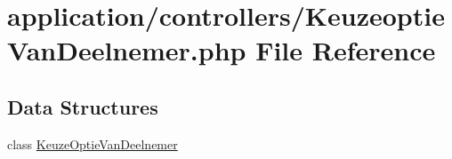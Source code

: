 \hypertarget{_keuzeoptie_van_deelnemer_8php}{}\section{application/controllers/\+Keuzeoptie\+Van\+Deelnemer.php File Reference}
\label{_keuzeoptie_van_deelnemer_8php}
\subsection*{Data Structures}
\begin{DoxyCompactItemize}
\item 
class \mbox{\hyperlink{class_keuze_optie_van_deelnemer}{Keuze\+Optie\+Van\+Deelnemer}}
\end{DoxyCompactItemize}
